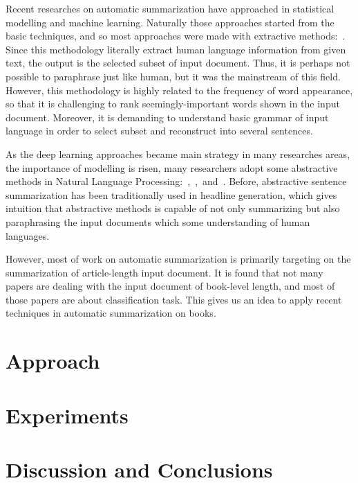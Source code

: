 Recent researches on automatic summarization have approached in statistical
modelling and machine learning. Naturally those approaches started from the
basic techniques, and so most approaches were made with extractive
methods:~\cite{2017arXiv170804439V}. Since this methodology literally extract
human language information from given text, the output is the selected subset
of input document. Thus, it is perhaps not possible to paraphrase just like
human, but it was the mainstream of this field. However, this methodology is
highly related to the frequency of word appearance, so that it is challenging
to rank seemingly-important words shown in the input document. Moreover, it is
demanding to understand basic grammar of input language in order to select
subset and reconstruct into several sentences.

As the deep learning approaches became main strategy in many researches areas,
the importance of modelling is risen, many researchers adopt some abstractive
methods in Natural Language
Processing:~\cite{2016arXiv160206023N},~\cite{2017arXiv170404368S},~and~\cite{Rush2015}.
Before, abstractive sentence summarization has been traditionally used in
headline generation, which gives intuition that abstractive methods is capable
of not only summarizing but also paraphrasing the input documents which some
understanding of human languages. 

However, most of work on automatic summarization is primarily targeting on
the summarization of article-length input document. It is found that not many
papers are dealing with the input document of book-level length, and most of
those papers are about classification task. This gives us an idea to apply
recent techniques in automatic summarization on books.


\section{Approach}





\section{Experiments}


\section{Discussion and Conclusions} %


